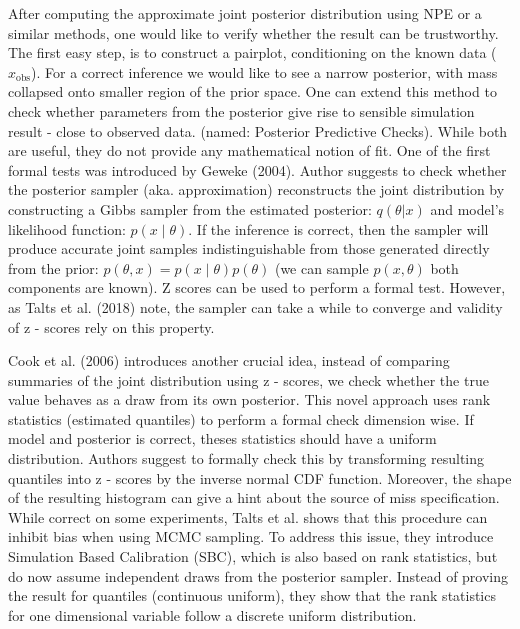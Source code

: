 \documentclass[12pt]{article}
\begin{document}
After computing the approximate joint posterior distribution using NPE or a similar methods, one would like to verify whether the result can be trustworthy. The first easy step, is to construct a pairplot, conditioning on the known data ($x_\text{obs}$). For a correct inference we would like to see a narrow posterior, with mass collapsed onto smaller region of the prior space. One can extend this method to check whether parameters from the posterior give rise to sensible simulation result - close to observed data. (named: Posterior Predictive Checks). While both are useful, they do not provide any mathematical notion of fit. One of the first formal tests was introduced by Geweke (2004). Author suggests to check whether the posterior sampler (aka. approximation) reconstructs the joint distribution by constructing a Gibbs sampler from the estimated posterior: $q(\theta |x )$ and model's likelihood function: $p(x \mid \theta)$. If the inference is correct, then the sampler will produce accurate joint samples indistinguishable from those generated directly from the prior: $p(\theta, x) = p(x \mid \theta)p(\theta)$ (we can sample $p(x, \theta)$ both components are known). Z scores can be used to perform a formal test. However, as Talts et al. (2018) note, the sampler can take a while to converge and validity of z - scores rely on this property.

Cook et al. (2006) introduces another crucial idea, instead of comparing summaries of the joint distribution using z - scores, we check whether the true value behaves as a draw from its own posterior. This novel approach uses rank statistics (estimated quantiles) to perform a formal check dimension wise. If model and posterior is correct, theses statistics should have a uniform distribution. Authors suggest to formally check this by transforming resulting quantiles into z - scores by the inverse normal CDF function. Moreover, the shape of the resulting histogram can give a hint about the source of miss specification. While correct on some experiments, Talts et al. shows that this procedure can inhibit bias when using MCMC sampling. To address this issue, they introduce Simulation Based Calibration (SBC), which is also based on rank statistics, but do now assume independent draws from the posterior sampler. Instead of proving the result for quantiles (continuous uniform), they show that the rank statistics for one dimensional variable follow a discrete uniform distribution. 
\end{document}
